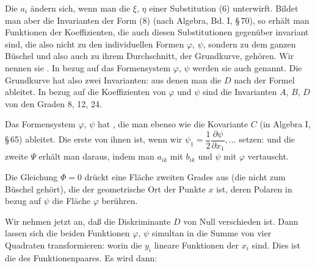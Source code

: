 
Die $a_i$ ändern sich, wenn man die $\xi$, $\eta$ einer Substitution (6)
unterwirft. Bildet man aber die Invarianten der Form (8) (nach
Algebra, Bd. I, §\,70), so erhält man Funktionen der Koeffizienten,
die auch diesen Substitutionen gegenüber invariant sind, die also
nicht zu den individuellen Formen $\varphi$, $\psi$, sondern zu dem
ganzen Büschel und also auch zu ihrem Durchschnitt, der Grundkurve,
gehören. Wir nennen sie . In bezug auf das
Formensystem $\varphi$, $\psi$ werden sie auch  genannt.
Die Grundkurve hat also zwei Invarianten:
aus denen man die  $D$ nach der Formel
ableitet. In bezug auf die Koeffizienten von $\varphi$ und $\psi$ sind die
Invarianten $A$, $B$, $D$ von den Graden 8, 12, 24.

Das Formensystem $\varphi$, $\psi$ hat , die man ebenso wie die Kovariante $C$ (in Algebra I,
§\,65) ableitet. Die erste von ihnen ist, wenn wir
$\psi_1 = \dfrac{1}{2}\dfrac{\partial \psi}{\partial x_1}, \dots$
setzen:
und die zweite $\Psi$ erhält man daraus, indem man $a_{ik}$ mit $b_{ik}$
und $\psi$ mit $\varphi$ vertauscht.

Die Gleichung $\Phi = 0$ drückt eine Fläche zweiten Grades aus (die
nicht zum Büschel gehört), die der geometrische Ort der Punkte $x$
ist, deren Polaren in bezug auf $\psi$ die Fläche $\varphi$ berühren.

Wir nehmen jetzt an, daß die Diskriminante $D$ von Null verschieden
ist. Dann lassen sich die beiden Funktionen $\varphi$, $\psi$
simultan in die Summe von vier Quadraten transformieren:
worin die $y_i$ lineare Funktionen der $x_i$ sind. Dies ist die
 des Funktionenpaares. Es wird dann:
